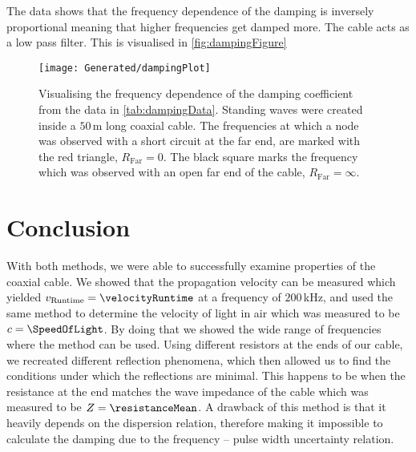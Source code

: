 \documentclass[a4paper,10pt,twocolumn]{article}
\begin{document}
    The data shows that the frequency dependence of the damping is inversely proportional meaning that higher frequencies get damped more.
    The cable acts as a low pass filter.
    This is visualised in \autoref{fig:dampingFigure}
    \begin{figure}
    \begin{center}
        \texttt{[image: Generated/dampingPlot]}
        \caption[]{Visualising the frequency dependence of the damping coefficient from the data in \autoref{tab:dampingData}.
        Standing waves were created inside a $50\,$m long coaxial cable.
        The frequencies at which a node was observed with a short circuit at the far end, are marked with the red triangle, $R_{\text{Far}}=0$.
        The black square marks the frequency which was observed with an open far end of the cable, $R_{\text{Far}}=\infty$.}   %
        \label{fig:dampingFigure}
    \end{center}
    \end{figure}
    
    \section{Conclusion}\label{sec:Conclusion}
    With both methods, we were able to successfully examine properties of the coaxial cable.
    We showed that the propagation velocity can be measured which yielded $v_{\text{Runtime}}=\velocityRuntime$ at a frequency of $200\,$kHz,
    and used the same method to determine the velocity of light in air which was measured to be $c=\SpeedOfLight$.
    By doing that we showed the wide range of frequencies where the method can be used.
    Using different resistors at the ends of our cable, we recreated different reflection phenomena, which then allowed us to 
    find the conditions under which the reflections are minimal.
    This happens to be when the resistance at the end matches the wave impedance of the cable which was measured to be $Z= \resistanceMean $.
    A drawback of this method is that it heavily depends on the dispersion relation, therefore making it impossible to calculate the damping due to the
    frequency -- pulse width uncertainty relation.
    
\end{document}
